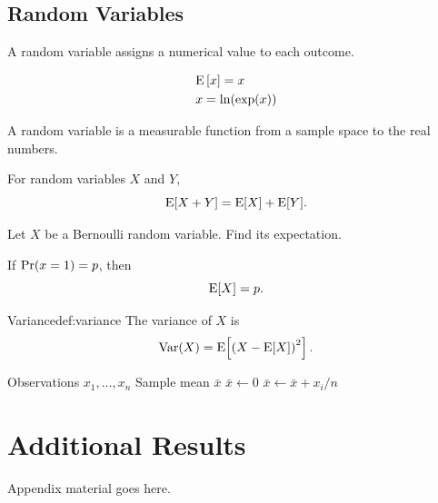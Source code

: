 \documentclass[10pt,a4paper]{book}
\begin{document}
\section{Random Variables}

A random variable assigns a numerical value to each outcome.

\begin{equation}
  \begin{aligned}
    & \mathrm{E}\bracket{x} = x \\
    & x = \ln\paren{\exp\paren{x}}
  \end{aligned}
\end{equation}

\begin{definition}
A random variable is a measurable function from a sample space
to the real numbers.
\end{definition}

\begin{theorem}
For random variables \(X\) and \(Y\),
\[
  \mathrm{E}[X+Y]
  =
  \mathrm{E}[X]+\mathrm{E}[Y].
\]
\end{theorem}

\begin{question}[Expectation]
Let \(X\) be a Bernoulli random variable. Find its expectation.
\end{question}

\begin{kaitou}
If $\mathrm{Pr}\paren{x=1} = p$, then
\[
  \mathrm{E}[X]=p.
\]
\end{kaitou}

\begin{defbox}{Variance}{def:variance}
The variance of \(X\) is
\[
  \operatorname{Var}(X)
  =
  \mathrm{E}\!\left[
    \left(X-\mathrm{E}[X]\right)^2
  \right].
\]
\end{defbox}

\begin{algorithm}
  \caption{Calculate the sample mean}
  \begin{algorithmic}
    \AlgInput Observations \(x_1,\dots,x_n\)
    \AlgOutput Sample mean \(\bar{x}\)
    \State \(\bar{x}\gets 0\)
      \State \(\bar{x}\gets\bar{x}+x_i/n\)
    \EndFor
  \end{algorithmic}
\end{algorithm}


\appendix
\chapter{Additional Results}

Appendix material goes here.
\end{document}
